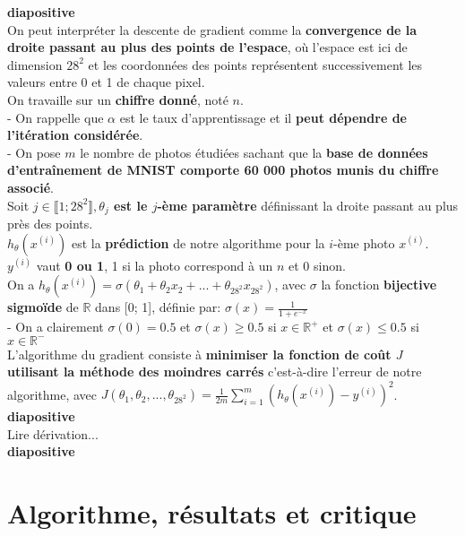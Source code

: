 \documentclass{article}
\begin{document}
	\textbf{diapositive}\\
	
	On peut interpréter la descente de gradient comme la \textbf{convergence de la droite passant au plus des points de l'espace}, où l'espace est ici de dimension $28^2$ et les coordonnées des points représentent successivement les valeurs entre 0 et 1 de chaque pixel.\\
	On travaille sur un \textbf{chiffre donné}, noté $n$.\\
	- On rappelle que $\alpha$ est le taux d'apprentissage et il \textbf{peut dépendre de l'itération considérée}.\\
	- On pose $m$ le nombre de photos étudiées sachant que la \textbf{base de données d'entraînement de MNIST comporte 60 000 photos munis du chiffre associé}.\\
	Soit $j \in \llbracket 1; 28^2 \rrbracket, $\textbf{$\theta_j$ est le $j$-ème paramètre} définissant la droite passant au plus près des points.\\
	$h_\theta(x^{(i)})$ est la \textbf{prédiction} de notre algorithme pour la $i$-ème photo $x^{(i)}$.\\
	$y^{(i)}$ vaut \textbf{0 ou 1}, 1 si la photo correspond à un $n$ et 0 sinon.\\
	On a $h_\theta(x^{(i)}) = \sigma(\theta_1 + \theta_2 x_2 + ... + \theta_{28^2} x_{28^2})$, avec $\sigma$ la fonction \textbf{bijective sigmoïde} de $\mathbb{R}$ dans [0; 1], définie par: $\sigma(x) = \frac{1}{1 + e^{-x}}$\\
	- On a clairement $\sigma(0) = 0.5$ et $\sigma(x) \geq 0.5$ si $x \in \mathbb{R}^+$ et $\sigma(x) \leq 0.5$ si $x \in \mathbb{R}^-$\\
	L'algorithme du gradient consiste à \textbf{minimiser la fonction de coût $J$ utilisant la méthode des moindres carrés} c'est-à-dire l'erreur de notre algorithme, avec $J(\theta_1, \theta_2, ..., \theta_{28^2}) = \frac{1}{2m}\sum_{i=1}^{m}(h_\theta(x^{(i)}) - y^{(i)})^2$.\\
	
	\textbf{diapositive}\\
	
	Lire dérivation...\\
	
	\textbf{diapositive}\\
	
	\section{Algorithme, résultats et critique}
	
\end{document}
